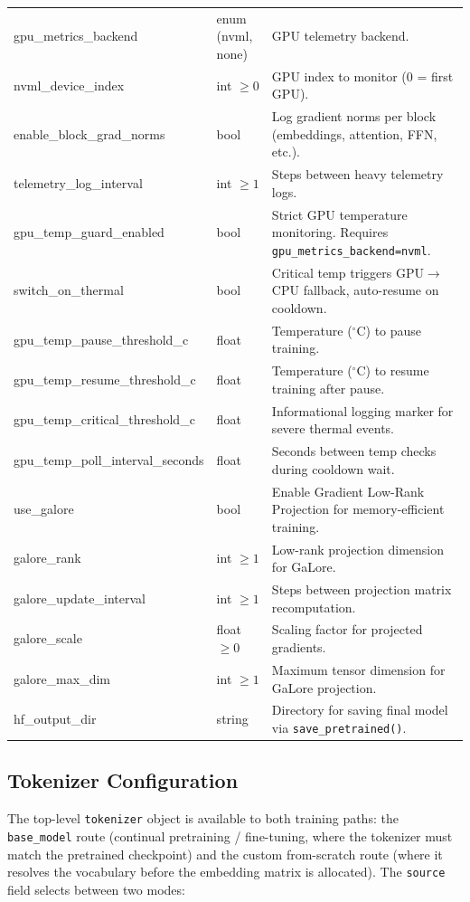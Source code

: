 \begin{longtable}{>{\ttfamily\footnotesize\raggedright\arraybackslash}p{5.6cm}>{\raggedright\arraybackslash}p{2.4cm}>{\raggedright\arraybackslash}p{6.9cm}}
gpu\_metrics\_backend & enum (nvml, none) & GPU telemetry backend. \\
nvml\_device\_index & int $\ge 0$ & GPU index to monitor (0 = first GPU). \\
enable\_block\_grad\_norms & bool & Log gradient norms per block (embeddings, attention, FFN, etc.). \\
telemetry\_log\_interval & int $\ge 1$ & Steps between heavy telemetry logs. \\
gpu\_temp\_guard\_enabled & bool & Strict GPU temperature monitoring. Requires \texttt{gpu\_metrics\_backend=nvml}. \\
switch\_on\_thermal & bool & Critical temp triggers GPU$\to$CPU fallback, auto-resume on cooldown. \\
gpu\_temp\_pause\_threshold\_c & float & Temperature ($^\circ$C) to pause training. \\
gpu\_temp\_resume\_threshold\_c & float & Temperature ($^\circ$C) to resume training after pause. \\
gpu\_temp\_critical\_threshold\_c & float & Informational logging marker for severe thermal events. \\
gpu\_temp\_poll\_interval\_seconds & float & Seconds between temp checks during cooldown wait. \\
use\_galore & bool & Enable Gradient Low-Rank Projection for memory-efficient training. \\
galore\_rank & int $\ge 1$ & Low-rank projection dimension for GaLore. \\
galore\_update\_interval & int $\ge 1$ & Steps between projection matrix recomputation. \\
galore\_scale & float $\ge 0$ & Scaling factor for projected gradients. \\
galore\_max\_dim & int $\ge 1$ & Maximum tensor dimension for GaLore projection. \\
hf\_output\_dir & string & Directory for saving final model via \texttt{save\_pretrained()}. \\
\end{longtable}

\subsection{Tokenizer Configuration}
\label{subsec:tokenizer-config}

The top-level \texttt{tokenizer} object is available to both training paths: the \texttt{base\_model} route (continual pretraining / fine-tuning, where the tokenizer must match the pretrained checkpoint) and the custom from-scratch route (where it resolves the vocabulary before the embedding matrix is allocated). The \texttt{source} field selects between two modes:

